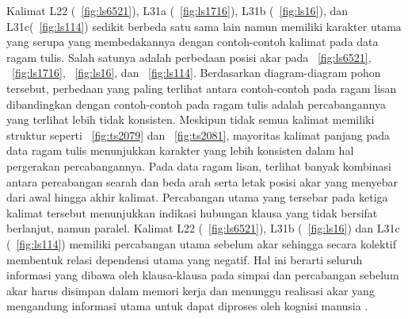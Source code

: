 Kalimat L22 (\pic~\ref{fig:ls6521}), L31a (\pic~\ref{fig:ls1716}), L31b (\pic~\ref{fig:ls16}), dan L31c(\pic~\ref{fig:ls114}) sedikit berbeda satu sama lain namun memiliki karakter utama yang serupa yang membedakannya dengan contoh-contoh kalimat pada data ragam tulis. Salah satunya adalah perbedaan posisi akar pada \pic~\ref{fig:ls6521}, \pic~\ref{fig:ls1716}, \pic~\ref{fig:ls16}, dan \pic~\ref{fig:ls114}. Berdasarkan diagram-diagram pohon tersebut, perbedaan yang paling terlihat antara contoh-contoh pada ragam lisan dibandingkan dengan contoh-contoh pada ragam tulis adalah percabangannya yang terlihat lebih tidak konsisten. Meskipun tidak semua kalimat memiliki struktur seperti \pic~\ref{fig:ts2079} dan \pic~\ref{fig:ts2081}, mayoritas kalimat panjang pada data ragam tulis menunjukkan karakter yang lebih konsisten dalam hal pergerakan percabangannya. Pada data ragam lisan, terlihat banyak kombinasi antara percabangan searah dan beda arah serta letak posisi akar yang menyebar dari awal hingga akhir kalimat. Percabangan utama yang tersebar pada ketiga kalimat tersebut menunjukkan indikasi hubungan klausa yang tidak bersifat berlanjut, namun paralel. Kalimat L22 (\pic~\ref{fig:ls6521}), L31b (\pic~\ref{fig:ls16}) dan L31c (\pic~\ref{fig:ls114}) memiliki percabangan utama sebelum akar sehingga secara kolektif membentuk relasi dependensi utama yang negatif. Hal ini berarti seluruh informasi yang dibawa oleh klausa-klausa pada simpai dan percabangan sebelum akar harus disimpan dalam memori kerja dan menunggu realisasi akar yang mengandung informasi utama untuk dapat diproses oleh kognisi manusia \citep{hawkins2014cross}.

